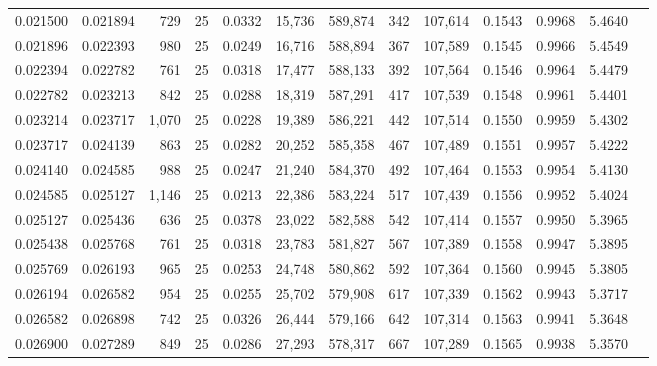 \begin{tabular}{rrrrrrrrrrrrr}
0.021500 & 0.021894 &   729 &  25 &                                     0.0332 &  15,736 & 589,874 &     342 & 107,614 & 0.1543 & 0.9968 & 5.4640 \\
0.021896 & 0.022393 &   980 &  25 &                                     0.0249 &  16,716 & 588,894 &     367 & 107,589 & 0.1545 & 0.9966 & 5.4549 \\
0.022394 & 0.022782 &   761 &  25 &                                     0.0318 &  17,477 & 588,133 &     392 & 107,564 & 0.1546 & 0.9964 & 5.4479 \\
0.022782 & 0.023213 &   842 &  25 &                                     0.0288 &  18,319 & 587,291 &     417 & 107,539 & 0.1548 & 0.9961 & 5.4401 \\
0.023214 & 0.023717 & 1,070 &  25 &                                     0.0228 &  19,389 & 586,221 &     442 & 107,514 & 0.1550 & 0.9959 & 5.4302 \\
0.023717 & 0.024139 &   863 &  25 &                                     0.0282 &  20,252 & 585,358 &     467 & 107,489 & 0.1551 & 0.9957 & 5.4222 \\
0.024140 & 0.024585 &   988 &  25 &                                     0.0247 &  21,240 & 584,370 &     492 & 107,464 & 0.1553 & 0.9954 & 5.4130 \\
0.024585 & 0.025127 & 1,146 &  25 &                                     0.0213 &  22,386 & 583,224 &     517 & 107,439 & 0.1556 & 0.9952 & 5.4024 \\
0.025127 & 0.025436 &   636 &  25 &                                     0.0378 &  23,022 & 582,588 &     542 & 107,414 & 0.1557 & 0.9950 & 5.3965 \\
0.025438 & 0.025768 &   761 &  25 &                                     0.0318 &  23,783 & 581,827 &     567 & 107,389 & 0.1558 & 0.9947 & 5.3895 \\
0.025769 & 0.026193 &   965 &  25 &                                     0.0253 &  24,748 & 580,862 &     592 & 107,364 & 0.1560 & 0.9945 & 5.3805 \\
0.026194 & 0.026582 &   954 &  25 &                                     0.0255 &  25,702 & 579,908 &     617 & 107,339 & 0.1562 & 0.9943 & 5.3717 \\
0.026582 & 0.026898 &   742 &  25 &                                     0.0326 &  26,444 & 579,166 &     642 & 107,314 & 0.1563 & 0.9941 & 5.3648 \\
0.026900 & 0.027289 &   849 &  25 &                                     0.0286 &  27,293 & 578,317 &     667 & 107,289 & 0.1565 & 0.9938 & 5.3570 \\

\end{tabular}
